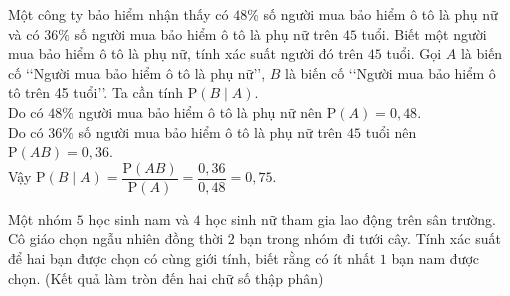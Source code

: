 \begin{ex}%
	Một công ty bảo hiểm nhận thấy có $48 \%$ số người mua bảo hiểm ô tô là phụ nữ và có $36 \%$ số người mua bảo hiểm ô tô là phụ nữ trên $45$ tuổi. Biết một người mua bảo hiểm ô tô là phụ nữ, tính xác suất người đó trên $45$ tuổi.
	\loigiai
	{
	Gọi $A$ là biến cố \lq\lq  Người mua bảo hiểm ô tô là phụ nữ\rq\rq, $B$ là biến cố \lq\lq  Người mua bảo hiểm ô tô trên 45 tuổi\rq\rq. Ta cần tính $\mathrm{P}(B \mid A)$.\\
	Do có $48 \%$ người mua bảo hiểm ô tô là phụ nữ nên $\mathrm{P}(A)=0{,}48$.\\
	Do có $36 \%$ số người mua bảo hiểm ô tô là phụ nữ trên $45$ tuổi nên $\mathrm{P}(A B)=0{,}36$.\\
	Vậy $\mathrm{P}(B \mid A)=\dfrac{\mathrm{P}(A B)}{\mathrm{P}(A)}=\dfrac{0{,}36}{0{,}48}=0{,}75$. 
	}
\end{ex}
\begin{ex}%
	Một nhóm $5$ học sinh nam và $4$ học sinh nữ tham gia lao động trên sân trường. Cô giáo chọn ngẫu nhiên đồng thời $2$ bạn trong nhóm đi tưới cây. Tính xác suất để hai bạn được chọn có cùng giới tính, biết rằng có ít nhất $1$ bạn nam được chọn.	(Kết quả làm tròn đến hai chữ số thập phân)
\end{ex}
